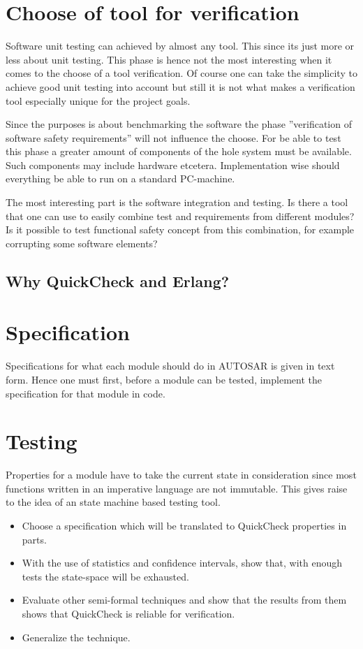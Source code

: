 
\section{Choose of tool for verification}
Software unit testing can achieved by almost any tool. This since its just more
or less about unit testing. This phase is hence not the most interesting when it
comes to the choose of a tool verification. Of course one can take the simplicity
to achieve good unit testing into account but still it is not what makes
a verification tool especially unique for the project goals.

Since the purposes is about benchmarking the software the phase ''verification of
software safety requirements'' will not influence the choose. For be able to test
this phase a greater amount of components of the hole system must be available. Such
components may include hardware etcetera. Implementation wise should everything
be able to run on a standard PC-machine.

The most interesting part is the software integration and testing. Is there a
tool that one can use to easily combine test and requirements from different
modules? Is it possible to test functional safety concept from this
combination, for example corrupting some software elements?

\subsection{Why QuickCheck and Erlang?}

\section{Specification}
Specifications for what each module should do in AUTOSAR is given in text form.
Hence one must first, before a module can be tested, implement the specification
for that module in code.
\section{Testing}
Properties for a module have to take the current state in consideration since
most functions written in an imperative language are not immutable. This gives
raise to the idea of an state machine based testing tool.
\begin{itemize}
\item Choose a specification which will be translated to QuickCheck properties
in parts.
\item With the use of statistics and confidence intervals, show that, with
enough tests the state-space will be exhausted.
\item Evaluate other semi-formal techniques and show that the results from them
shows that QuickCheck is reliable for verification.
\item Generalize the technique.
\end{itemize}


